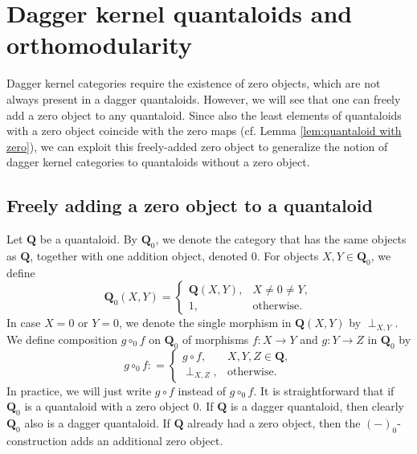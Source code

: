\documentclass[12pt]{tac}
\theoremstyle{definition}
\theoremstyle{remark}
\newcommand{\<}{\langle}
\renewcommand{\>}{\rangle}
\renewcommand{\:}{\colon}
\begin{document}
\section{Dagger kernel quantaloids and orthomodularity}\label{sec:orthomodular}



Dagger kernel categories require the existence of zero objects, which are not always present in a dagger quantaloids. However, we will see that one can freely add a zero object to any quantaloid. Since also the least elements of quantaloids with a zero object coincide with the zero maps (cf. Lemma \ref{lem:quantaloid with zero}), we can exploit this freely-added zero object to generalize the notion of dagger kernel categories to quantaloids without a zero object. 

\subsection{Freely adding a zero object to a quantaloid}
Let $\mathbf Q$ be a quantaloid. By $\mathbf Q_0$, we denote the category that has the same objects as $\mathbf Q$, together with one addition object, denoted $0$. For objects $X,Y\in\mathbf Q_0$, we define
\[\mathbf Q_0(X,Y) = \begin{cases}
\mathbf Q(X,Y), & X\neq 0\neq Y,\\
1, & \text{otherwise}.
\end{cases}\]
In case $X=0$ or $Y=0$, we denote the single morphism in $\mathbf Q(X,Y)$ by $\perp_{X,Y}$. We define composition $g\circ_0 f$ on $\mathbf Q_0$ of morphisms  $f:X\to Y$ and $g:Y\to Z$ in $\mathbf{Q}_0$ by
\[ g\circ_0 f : =\begin{cases} g\circ f, & X,Y,Z\in\mathbf Q,\\
\perp_{X,Z}, & \text{otherwise}.
\end{cases}\]
In practice, we will just write $g\circ f$ instead of $g\circ_0 f$.
It is straightforward that if $\mathbf Q_0$ is a quantaloid with a zero object $0$. If $\mathbf Q$ is a dagger quantaloid, then clearly $\mathbf Q_0$ also is a dagger quantaloid. If $\mathbf Q$ already had a zero object, then the $(-)_0$-construction adds an additional zero object.
\end{document}
